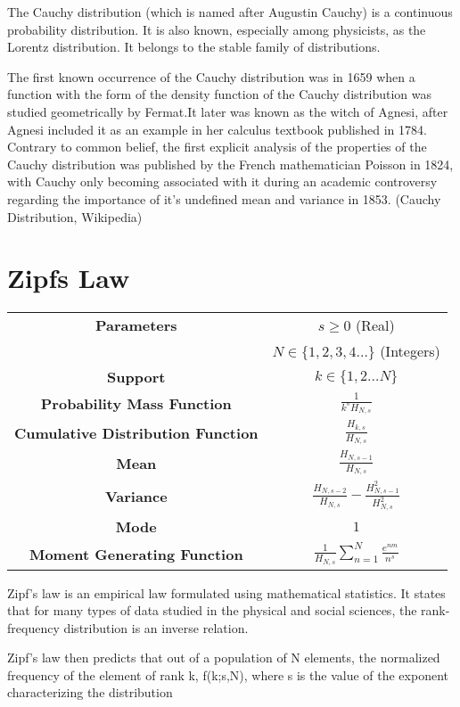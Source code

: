 \documentclass[14pt, a4paper]{article}
\theoremstyle{definition}
\begin{document}
The Cauchy distribution (which is named after Augustin Cauchy) is a continuous probability distribution. It is also known, especially among physicists, as the Lorentz distribution. It belongs to the stable family of distributions.

The first known occurrence of the Cauchy distribution was in 1659 when a function with the form of the density function of the Cauchy distribution was studied geometrically by Fermat.It later was known as the witch of Agnesi, after Agnesi included it as an example in her calculus textbook published in 1784. Contrary to common belief, the first explicit analysis of the properties of the Cauchy distribution was published by the French mathematician Poisson in 1824, with Cauchy only becoming associated with it during an academic controversy regarding the importance of it's undefined mean and variance in 1853. (Cauchy Distribution, Wikipedia)
  
  
\section{Zipfs Law}
\begin{tabular}{|c|c|}  %
\hline
 \textbf{Parameters }& $s \geq 0$ (Real) \\ & $N \in \{ 1,2,3,4 \dots \}$ (Integers) \\
 \hline
 \textbf{Support} & $k \in \{ 1,2 \dots N \} $ \\
 \hline
 \textbf{Probability Mass Function} & 
 $ \frac{1}{k^s H_{N,s}}$
 \\
 \hline
 \textbf{Cumulative Distribution Function} &  $\frac{H_{k,s}}{H_{N,s}}$ \\
 \hline
 \textbf{Mean} & $\frac{H_{N,s-1}}{H_{N,s}}$ \\ 
 \hline
 \textbf{Variance} & $\frac{H_{N,s-2}}{H_{N,s}} - \frac{H^2_{N,s-1}}{H^2_{N,s}}$ \\
 \hline
 \textbf{Mode} & $1$ \\
 \hline
 \textbf{Moment Generating Function} & $\frac{1}{H_{N,s}} \sum^N_{n=1}\frac{e^{nm}}{n^s}$ \\
 \hline

  \end{tabular}
  
  
Zipf's law is an empirical law formulated using mathematical statistics. It states that for many types of data studied in the physical and social sciences, the rank-frequency distribution is an inverse relation.

Zipf's law then predicts that out of a population of N elements, the normalized frequency of the element of rank k, f(k;s,N), where s is  the value of the exponent characterizing the distribution
\end{document}
